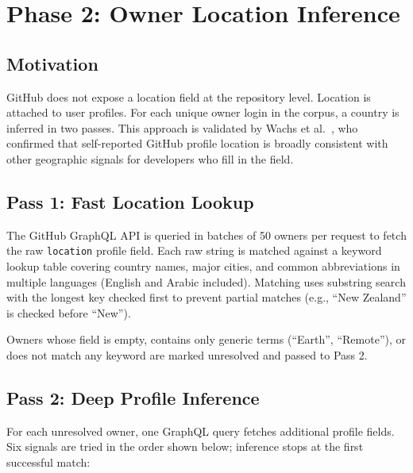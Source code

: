 \documentclass[12pt, a4paper]{article}
\begin{document}
\section{Phase 2: Owner Location Inference}

\subsection{Motivation}

GitHub does not expose a location field at the repository level. Location is
attached to user profiles. For each unique owner login in the corpus, a
country is inferred in two passes. This approach is validated by Wachs et
al.~\cite{wachs2022}, who confirmed that self-reported GitHub profile location
is broadly consistent with other geographic signals for developers who fill
in the field.

\subsection{Pass 1: Fast Location Lookup}

The GitHub GraphQL API is queried in batches of 50 owners per request to
fetch the raw \texttt{location} profile field. Each raw string is matched
against a keyword lookup table covering country names, major cities, and
common abbreviations in multiple languages (English and Arabic included).
Matching uses substring search with the longest key checked first to prevent
partial matches (e.g., ``New Zealand'' is checked before ``New'').

Owners whose field is empty, contains only generic terms (``Earth'',
``Remote''), or does not match any keyword are marked unresolved and passed
to Pass 2.

\subsection{Pass 2: Deep Profile Inference}

For each unresolved owner, one GraphQL query fetches additional profile
fields. Six signals are tried in the order shown below; inference stops at
the first successful match:
\end{document}
